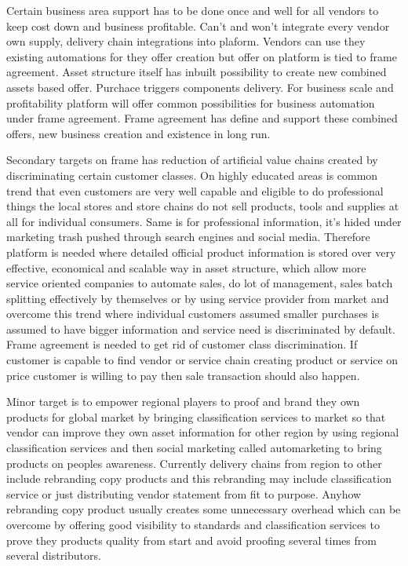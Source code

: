 Certain business area support has to be done once and well for all vendors to
keep cost down and business profitable. Can't and won't integrate every vendor
own supply, delivery chain integrations into plaform. Vendors can use they
existing automations for they offer creation but offer on platform is tied to
frame agreement. Asset structure itself has inbuilt possibility to create new
combined assets based offer. Purchace triggers components delivery. For
business scale and profitability platform will offer common possibilities for
business automation under frame agreement. Frame agreement has define and
support these combined offers, new business creation and existence in long
run.

Secondary targets on frame has reduction of artificial value chains created
by discriminating certain customer classes. On highly educated areas is common
trend that even customers are very well capable and eligible to do
professional things the local stores and store chains do not sell products,
tools and supplies at all for individual consumers. Same is for professional
information, it's hided under marketing trash pushed through search engines
and social media. Therefore platform is needed where detailed official product
information is stored over very effective, economical and scalable way in
asset structure, which allow more service oriented companies to automate
sales, do lot of management, sales batch splitting effectively by themselves
or by using service provider from market and overcome this trend where
individual customers assumed smaller purchases is assumed to have bigger
information and service need is discriminated by default. Frame agreement is
needed to get rid of customer class discrimination. If customer is capable to
find vendor or service chain creating product or service on price customer is
willing to pay then sale transaction should also happen.

Minor target is to empower regional players to proof and brand they own
products for global market by bringing classification services to market so
that vendor can improve they own asset information for other region by using
regional classification services and then social marketing called
automarketing to bring products on peoples awareness. Currently delivery
chains from region to other include rebranding copy products and this
rebranding may include classification service or just distributing vendor
statement from fit to purpose. Anyhow rebranding copy product usually creates
some unnecessary overhead which can be overcome by offering good visibility to
standards and classification services to prove they products quality from
start and avoid proofing several times from several distributors.

